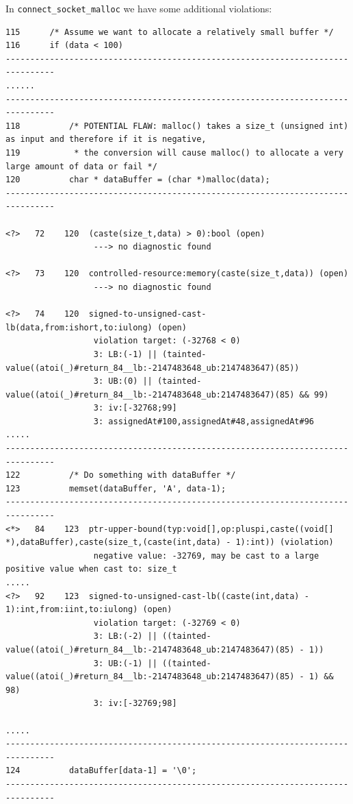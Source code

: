 \documentclass[11pt]{article}
\begin{document}
In  {\tt connect\_socket\_malloc} we have some additional violations:
\begin{tiny}
\begin{verbatim}
115      /* Assume we want to allocate a relatively small buffer */
116      if (data < 100)
--------------------------------------------------------------------------------
......
--------------------------------------------------------------------------------
118          /* POTENTIAL FLAW: malloc() takes a size_t (unsigned int) as input and therefore if it is negative,
119           * the conversion will cause malloc() to allocate a very large amount of data or fail */
120          char * dataBuffer = (char *)malloc(data);
--------------------------------------------------------------------------------

<?>   72    120  (caste(size_t,data) > 0):bool (open)
                  ---> no diagnostic found
 
<?>   73    120  controlled-resource:memory(caste(size_t,data)) (open)
                  ---> no diagnostic found
 
<?>   74    120  signed-to-unsigned-cast-lb(data,from:ishort,to:iulong) (open)
                  violation target: (-32768 < 0)
                  3: LB:(-1) || (tainted-value((atoi(_)#return_84__lb:-2147483648_ub:2147483647)(85))
                  3: UB:(0) || (tainted-value((atoi(_)#return_84__lb:-2147483648_ub:2147483647)(85) && 99)
                  3: iv:[-32768;99]
                  3: assignedAt#100,assignedAt#48,assignedAt#96
.....
--------------------------------------------------------------------------------
122          /* Do something with dataBuffer */
123          memset(dataBuffer, 'A', data-1);
--------------------------------------------------------------------------------
<*>   84    123  ptr-upper-bound(typ:void[],op:pluspi,caste((void[] *),dataBuffer),caste(size_t,(caste(int,data) - 1):int)) (violation)
                  negative value: -32769, may be cast to a large positive value when cast to: size_t
.....
<?>   92    123  signed-to-unsigned-cast-lb((caste(int,data) - 1):int,from:iint,to:iulong) (open)
                  violation target: (-32769 < 0)
                  3: LB:(-2) || ((tainted-value((atoi(_)#return_84__lb:-2147483648_ub:2147483647)(85) - 1))
                  3: UB:(-1) || ((tainted-value((atoi(_)#return_84__lb:-2147483648_ub:2147483647)(85) - 1) && 98)
                  3: iv:[-32769;98]
 
.....
--------------------------------------------------------------------------------
124          dataBuffer[data-1] = '\0';
--------------------------------------------------------------------------------


\end{verbatim}
\end{tiny}
\end{document}
